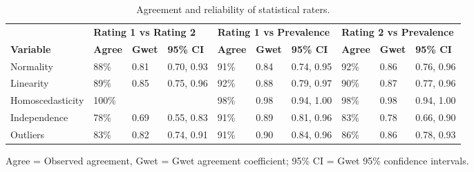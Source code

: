 \begin{table}[H]
\begin{widestuff}
\caption{ Agreement and reliability of statistical raters.} 
\begin{flushleft}  \begin{tabular}{llllllllll}
  \toprule & \multicolumn{3}{l}{\textbf{Rating 1 vs Rating 2}} & \multicolumn{3}{l}{\textbf{Rating 1 vs Prevalence}} & \multicolumn{3}{l}{\textbf{Rating 2 vs Prevalence}} \\
\cline{2-10}
{\bf Variable} & {\bf Agree} & {\bf Gwet} & {\bf 95\% CI} & {\bf Agree} & {\bf Gwet} & {\bf 95\% CI} & {\bf Agree} & {\bf Gwet} & {\bf 95\% CI} \\ 
  \midrule
Normality & 88\% & 0.81 & 0.70, 0.93 & 91\% & 0.84 & 0.74, 0.95 & 92\% & 0.86 & 0.76, 0.96 \\ 
  Linearity & 89\% & 0.85 & 0.75, 0.96 & 92\% & 0.88 & 0.79, 0.97 & 90\% & 0.87 & 0.77, 0.96 \\ 
  Homoscedasticity & 100\% &   &   & 98\% & 0.98 & 0.94, 1.00 & 98\% & 0.98 & 0.94, 1.00 \\ 
  Independence & 78\% & 0.69 & 0.55, 0.83 & 91\% & 0.89 & 0.81, 0.96 & 83\% & 0.78 & 0.66, 0.90 \\ 
  Outliers & 83\% & 0.82 & 0.74, 0.91 & 91\% & 0.90 & 0.84, 0.96 & 86\% & 0.86 & 0.78, 0.93 \\ 
   \bottomrule
\end{tabular} \end{flushleft} \begin{flushleft}  Agree = Observed agreement, Gwet = Gwet agreement coefficient; 95\% CI = Gwet 95\% confidence intervals. \end{flushleft}
\end{widestuff}
\end{table}


